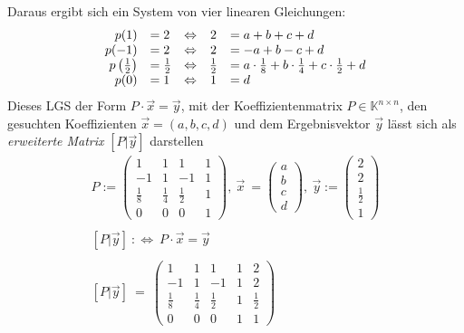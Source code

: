 Daraus ergibt sich ein System von vier linearen Gleichungen:
\begin{equation*}
	\begin{array}{ r l c c l }
		p( 1) & =2 & \Leftrightarrow  & 2 & =a+b+c+d\\
		p( -1) & =2 & \Leftrightarrow  & 2 & =-a+ b-c+d\\
		p\left(\frac{1}{2}\right) & =\frac{1}{2} & \Leftrightarrow  & \frac{1}{2} & =a\cdot \frac{1}{8} +b\cdot \frac{1}{4} +c\cdot \frac{1}{2} +d\\
		p( 0) & =1 & \Leftrightarrow  & 1 & =d
	\end{array}
\end{equation*}
Dieses LGS der Form $\displaystyle P\cdot \vec{x} =\vec{y}$, mit der Koeffizientenmatrix $\displaystyle P\in \mathbb{K}^{n\times n}$, den gesuchten Koeffizienten $\displaystyle \vec{x} =( a,b,c,d)$ und dem Ergebnisvektor $\displaystyle \vec{y}$ lässt sich als \textit{erweiterte Matrix} $\displaystyle [ P|\vec{y}]$ darstellen
\begin{gather*}
	P:=\begin{pmatrix}
		1 & 1 & 1 & 1\\
		-1 & 1 & -1 & 1\\
		\frac{1}{8} & \frac{1}{4} & \frac{1}{2} & 1\\
		0 & 0 & 0 & 1
	\end{pmatrix} ,\ \vec{x} \ =\begin{pmatrix}
		a\\
		b\\
		c\\
		d
	\end{pmatrix} ,\ \vec{y} :=\begin{pmatrix}
		2\\
		2\\
		\frac{1}{2}\\
		1
	\end{pmatrix}\\
	\\
	[ P|\vec{y}] \ :\Leftrightarrow \ P\cdot \vec{x} =\vec{y}\\
	\\
	[ P|\vec{y}] \ =\ \begin{pmatrix}
		1 & 1 & 1 & 1 & 2\\
		-1 & 1 & -1 & 1 & 2\\
		\frac{1}{8} & \frac{1}{4} & \frac{1}{2} & 1 & \frac{1}{2}\\
		0 & 0 & 0 & 1 & 1
	\end{pmatrix} \ 
\end{gather*}
